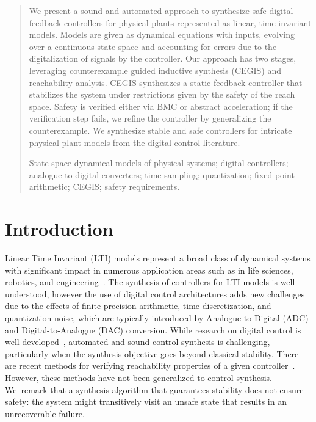 \documentclass[runningheads,a4paper]{llncs}
\newcommand{\keywords}[1]{\par\addvspace\baselineskip
\noindent\keywordname\enspace\ignorespaces#1}
\begin{document}
\author{%
Alessandro Abate \and
Iury Bessa \and
Dario Cattaruzza \and
Lucas Cordeiro \and
\mbox{Cristina David} \and
Pascal Kesseli \and
Daniel Kroening \and
Elizabeth Polgreen}



\maketitle

\begin{abstract}
%
We present a sound and automated approach to synthesize safe digital
feedback controllers for physical plants represented as linear, time
invariant models.  Models are given as dynamical equations with inputs,
evolving over a continuous state space and accounting for errors due to the
digitalization of signals by the controller.  Our approach has two stages,
leveraging counterexample guided inductive synthesis (CEGIS) and
reachability analysis.  CEGIS synthesizes a static feedback controller that
stabilizes the system under restrictions given by the safety of the reach
space.  Safety is verified either via BMC or abstract acceleration; if the
verification step fails, we refine the controller by generalizing the
counterexample.  We synthesize stable and safe controllers for intricate
physical plant models from the digital control literature.
%
\keywords{
State-space dynamical models of physical systems; 
digital controllers; 
analogue-to-digital converters; 
time sampling; 
quantization; 
fixed-point arithmetic; 
CEGIS; 
safety requirements. 
}
\end{abstract}


\section{Introduction}

Linear Time Invariant (LTI) models represent a broad class of dynamical
systems with significant impact in numerous application areas such as in life
sciences, robotics, and engineering~\cite{astrom1997computer,Franklin15}. 
The synthesis of controllers for LTI models is well understood, however the
use of digital control architectures adds new challenges due to the effects
of finite-precision arithmetic, time discretization, and quantization noise,
which are typically introduced by Analogue-to-Digital (ADC) and
Digital-to-Analogue (DAC) conversion.  While research on digital control is
well developed~\cite{astrom1997computer}, automated and sound control
synthesis is challenging, particularly when the synthesis objective goes
beyond classical stability.  There are recent methods for verifying
reachability properties of a given controller~\cite{FLD+11,Fre05}. 
However, these methods have not been generalized to control synthesis. 
We~remark that a synthesis algorithm that guarantees stability does not
ensure safety: the system might transitively visit an unsafe state that
results in an unrecoverable failure.
\end{document}
